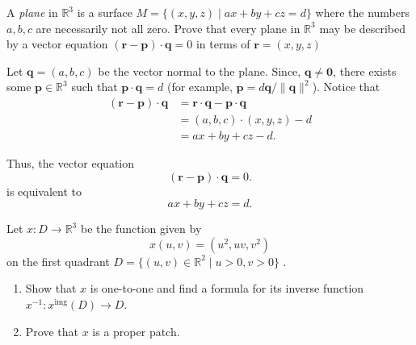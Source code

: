 \documentclass[12 pt, letterpaper]{hmcpset}
\begin{document}
\pagebreak

\begin{problem}[Problem 4.]
	A \textit{plane} in $\mathbb{R}^{3}$ is a surface $M = \{ (x, y, z) \mid ax + by + cz = d \}$ where the numbers $a, b, c$ are necessarily not all zero. Prove that every plane in $\mathbb{R}^{3}$ may be described by a vector equation $(\mathbf{r} - \mathbf{p}) \cdot \mathbf{q} = 0$ in terms of $\mathbf{r} = (x, y, z)$
\end{problem}

\begin{solution}
	Let $\mathbf{q} = (a, b, c)$ be the vector normal to the plane. Since, $\mathbf{q} \neq \mathbf{0}$, there exists some $\mathbf{p} \in \mathbb{R}^{3}$ such that $\mathbf{p} \cdot \mathbf{q} = d$ (for example, $\mathbf{p} = d \mathbf{q}/\lVert \mathbf{q} \rVert^{2}$).
	Notice that
	\[
		\begin{split}
			(\mathbf{r} - \mathbf{p}) \cdot \mathbf{q} & = \mathbf{r} \cdot \mathbf{q} - \mathbf{p} \cdot \mathbf{q} \\
								   & = (a, b, c) \cdot (x, y, z) - d \\
								   & = ax + by + cz - d.
		\end{split}
	\]
	
	Thus, the vector equation
	\[
		(\mathbf{r} - \mathbf{p}) \cdot \mathbf{q} = 0.
	\]
	is equivalent to
	\[
		ax + by + cz = d.
	\]
\end{solution}

\pagebreak

\begin{problem}[Problem 5.]
	Let $x : D \to \mathbb{R}^{3}$  be the function given by
	\[
		x(u, v) = (u^{2}, uv, v^{2})
	\]
	on the first quadrant $D = \{ (u, v) \in \mathbb{R}^{2} \mid u > 0, v > 0 \}$ .
	\begin{enumerate}
		\item Show that $x$ is one-to-one and find a formula for its inverse function $x^{-1} : x^{\text{img}}(D) \to D$.
		\item Prove that $x$ is a proper patch.
	\end{enumerate}
\end{problem}
\end{document}
